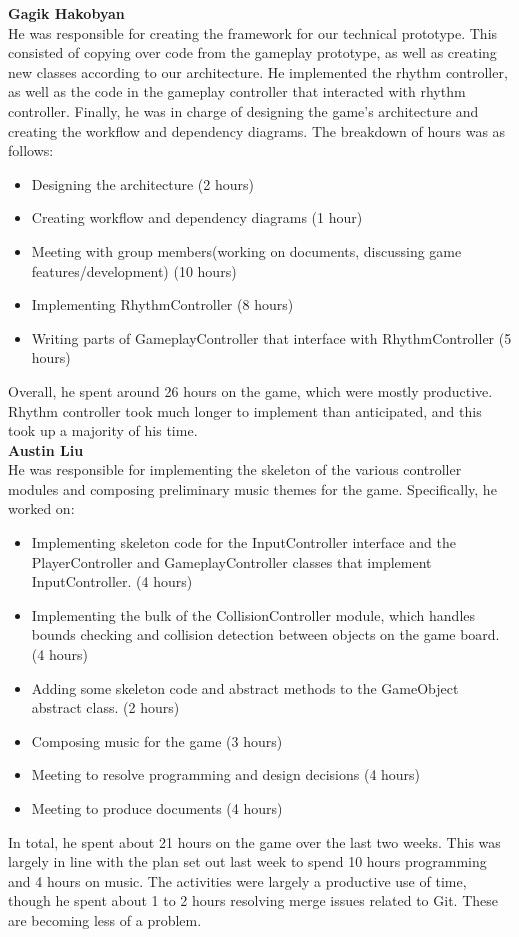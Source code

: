 \documentclass[]{article}
\begin{document}
\textbf{Gagik Hakobyan} \\
He was responsible for creating the framework for our technical
prototype. This consisted of copying over code from the gameplay
prototype, as well as creating new classes according to our
architecture. He implemented the rhythm controller, as well as the
code in the gameplay controller that interacted with rhythm
controller. Finally, he was in charge of designing the game’s
architecture and creating the workflow and dependency diagrams. The
breakdown of hours was as follows:
\begin{itemize}
\item Designing the architecture (2 hours)
\item Creating workflow and dependency diagrams (1 hour)
\item Meeting with group members(working on documents, discussing game 
  features/development) (10 hours)
\item Implementing RhythmController (8 hours)
\item Writing parts of GameplayController that interface with 
  RhythmController (5 hours)
\end{itemize}
Overall, he spent around 26 hours on the game, which were mostly
productive. Rhythm controller took much longer to implement than
anticipated, and this took up a majority of his time.\\

\textbf{Austin Liu} \\
He was responsible for implementing the skeleton of the various
controller modules and composing preliminary music themes for the
game. Specifically, he worked on:
\begin{itemize}
\item Implementing skeleton code for the InputController interface and the 
  PlayerController and GameplayController classes that implement 
  InputController. (4 hours)
\item Implementing the bulk of the CollisionController module, which handles 
  bounds checking and collision detection between objects on the game board. 
  (4 hours)
\item Adding some skeleton code and abstract methods to the GameObject 
  abstract class. (2 hours)
\item Composing music for the game (3 hours)
\item Meeting to resolve programming and design decisions (4 hours)
\item Meeting to produce documents (4 hours)
\end{itemize}
In total, he spent about 21 hours on the game over the last two weeks. 
This was largely in line 
with the plan set out last week to spend 10 hours programming and 
4 hours on music.
The activities were largely a productive use of time, though he spent about 
1 to 2 hours resolving merge issues related to Git. These are becoming less 
of a problem.\\
\end{document}
